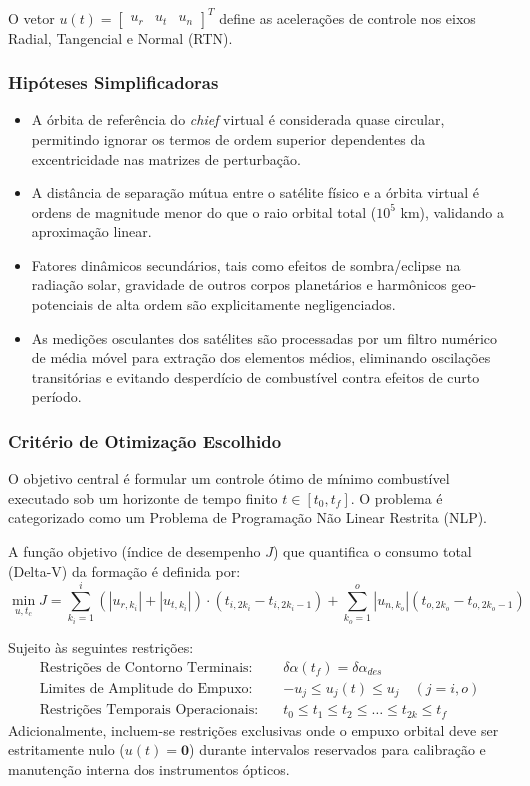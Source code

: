 \documentclass[a4paper, 12pt]{article}%
\begin{document}
O vetor $u(t) = \begin{bmatrix} u_r & u_t & u_n \end{bmatrix}^T$ define as acelerações de controle nos eixos Radial, Tangencial e Normal (RTN).

\subsubsection*{Hipóteses Simplificadoras}
\begin{itemize}
    \item A órbita de referência do \textit{chief} virtual é considerada quase circular, permitindo ignorar os termos de ordem superior dependentes da excentricidade nas matrizes de perturbação.
    \item A distância de separação mútua entre o satélite físico e a órbita virtual é ordens de magnitude menor do que o raio orbital total ($10^5$ km), validando a aproximação linear.
    \item Fatores dinâmicos secundários, tais como efeitos de sombra/eclipse na radiação solar, gravidade de outros corpos planetários e harmônicos geo-potenciais de alta ordem são explicitamente negligenciados.
    \item As medições osculantes dos satélites são processadas por um filtro numérico de média móvel para extração dos elementos médios, eliminando oscilações transitórias e evitando desperdício de combustível contra efeitos de curto período.
\end{itemize}

\subsubsection*{Critério de Otimização Escolhido}
O objetivo central é formular um controle ótimo de mínimo combustível executado sob um horizonte de tempo finito $t \in [t_0, t_f]$. O problema é categorizado como um Problema de Programação Não Linear Restrita (NLP).

A função objetivo (índice de desempenho $J$) que quantifica o consumo total (Delta-V) da formação é definida por:
\begin{equation}
    \min_{u, t_c} J = \sum_{k_i=1}^{i}(|u_{r,k_i}|+|u_{t,k_i}|)\cdot(t_{i,2k_i}-t_{i,2k_i-1}) + \sum_{k_o=1}^{o}|u_{n,k_o}|(t_{o,2k_o}-t_{o,2k_o-1})
\end{equation}

Sujeito às seguintes restrições:
\begin{align*}
    \text{Restrições de Contorno Terminais:} \quad & \delta\alpha(t_f) = \delta\alpha_{des} \\
    \text{Limites de Amplitude do Empuxo:} \quad & -u_j \le u_j(t) \le u_j \quad (j = i, o) \\
    \text{Restrições Temporais Operacionais:} \quad & t_0 \le t_1 \le t_2 \le \dots \le t_{2k} \le t_f
\end{align*}
Adicionalmente, incluem-se restrições exclusivas onde o empuxo orbital deve ser estritamente nulo ($u(t) = \mathbf{0}$) durante intervalos reservados para calibração e manutenção interna dos instrumentos ópticos.
\end{document}
